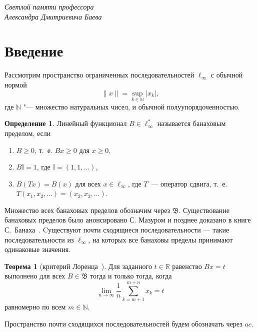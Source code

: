 \documentclass[a4paper,openbib]{article}
\renewcommand{\geq}{\geqslant} %
\theoremstyle{definition}
\newtheorem{theorem}[lemma]{Теорема}
\newtheorem{definition}[lemma]{Определение}
\begin{document}
\newpage

\begin{flushright}
	\textit{
		Светлой памяти профессора \\
		Александра Дмитриевича Баева
	}
\end{flushright}

\section{Введение}

Рассмотрим пространство ограниченных последовательностей $\ell_\infty$ с обычной нормой
\begin{equation*}
	\|x\| = \sup_{k\in\mathbb{N}} |x_k|
	,
\end{equation*}
где $\mathbb{N}$ "--- множество натуральных чисел,
и обычной полуупорядоченностью.


\begin{definition}
	Линейный функционал $B\in \ell_\infty^*$ называется банаховым пределом,
	если
	\begin{enumerate}[label=(\roman*)]
		\item
			$B\geq0$, т.~е. $Bx \geq 0$ для $x \geq 0$,
		\item
			$B\mathbb{I}=1$, где $\mathbb{I} =(1,1,\ldots)$,
		\item
			$B(Tx)=B(x)$ для всех $x\in \ell_\infty$, где $T$~---
		оператор сдвига, т.~е. $T(x_1,x_2,\ldots)=(x_2,x_3,\ldots)$.
	\end{enumerate}
\end{definition}
Множество всех банаховых пределов обозначим через $\mathfrak{B}$.
Существование банаховых пределов было анонсировано С. Мазуром \cite{Mazur} и позднее доказано в книге С.~Банаха~\cite{banach2001theory_rus}.
%
Cуществуют почти сходящиеся последовательности ---
такие последовательности из $\ell_\infty$,
на которых все банаховы пределы принимают одинаковые значения.
\begin{theorem}[критерий Лоренца~\cite{lorentz1948contribution}]
	Для заданного $t\in\mathbb{R}$ равенство $Bx=t$ выполнено для всех $B\in\mathfrak{B}$
	тогда и только тогда, когда
	\begin{equation}
		\label{eq:crit_Lorentz}
		\lim_{n\to\infty} \frac{1}{n} \sum_{k=m+1}^{m+n} x_k = t
	\end{equation}
	равномерно по всем $m\in\mathbb{N}$.
\end{theorem}


Пространство почти сходящихся последовательностей будем обозначать через $ac$.
\end{document}
